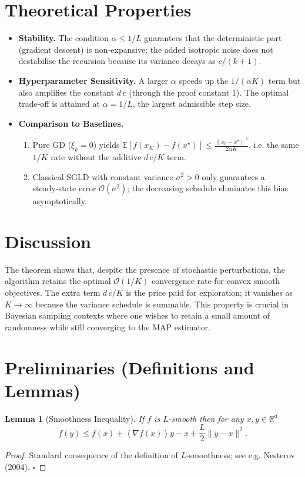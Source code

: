 \documentclass[11pt]{article}
\newtheorem{lemma}{Lemma}
\newcommand{\EE}{\mathbb{E}}
\newcommand{\RR}{\mathbb{R}}
\newcommand{\norm}[1]{\left\lVert #1\right\rVert}
\newcommand{\inner}[1]{\left\langle #1\right\rangle}
\begin{document}
\section*{Theoretical Properties}
\begin{itemize}
\item \textbf{Stability.} The condition $\alpha\le 1/L$ guarantees that the deterministic part (gradient descent) is non‑expansive; the added isotropic noise does not destabilise the recursion because its variance decays as $c/(k+1)$.
\item \textbf{Hyperparameter Sensitivity.} A larger $\alpha$ speeds up the $1/(\alpha K)$ term but also amplifies the constant $d\,c$ (through the proof constant $1$). The optimal trade‑off is attained at $\alpha=1/L$, the largest admissible step size.
\item \textbf{Comparison to Baselines.} 
  \begin{enumerate}
    \item Pure GD ($\xi_{k}=0$) yields $\EE[f(x_{K})-f(x^{\star})]\le \frac{\norm{x_{0}-x^{\star}}^{2}}{2\alpha K}$, i.e. the same $1/K$ rate without the additive $d\,c/K$ term.
    \item Classical SGLD with constant variance $\sigma^{2}>0$ only guarantees a steady‑state error $\mathcal O(\sigma^{2})$; the decreasing schedule eliminates this bias asymptotically.
  \end{enumerate}
\end{itemize}

\section*{Discussion}
The theorem shows that, despite the presence of stochastic perturbations, the algorithm retains the optimal $\mathcal O(1/K)$ convergence rate for convex smooth objectives. The extra term $d\,c/K$ is the price paid for exploration; it vanishes as $K\to\infty$ because the variance schedule is summable. This property is crucial in Bayesian sampling contexts where one wishes to retain a small amount of randomness while still converging to the MAP estimator.

\newpage
\section*{Preliminaries (Definitions and Lemmas)}
\begin{lemma}[Smoothness Inequality]\label{lem:smooth}
If $f$ is $L$‑smooth then for any $x,y\in\RR^{d}$
\[
f(y)\le f(x)+\inner{\nabla f(x)}{y-x}+\frac{L}{2}\|y-x\|^{2}.
\tag{L1}
\]
\end{lemma}
\begin{proof}
Standard consequence of the definition of $L$‑smoothness; see e.g. Nesterov (2004). \hfill $\square$
\end{proof}
\end{document}
